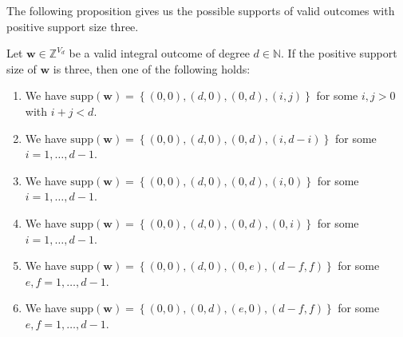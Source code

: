 The following proposition gives us the possible supports of valid outcomes with positive support size three.

\begin{proposition}\label{lemma:wmrkwjnr3w}
    Let \( \mathbf{w} \in \mathbb{Z}^{V_d} \) be a valid integral outcome of degree \( d \in \mathbb{N} \). If the positive support size of \( \mathbf{w} \) is three, then one of the following holds:
    \begin{enumerate}
        \item We have \( \mathrm{supp}(\mathbf{w}) = \left\{ (0,0), (d,0), (0,d), (i,j) \right\} \) for some \( i,j > 0 \) with \( i+j < d \).
        \item We have \( \mathrm{supp}(\mathbf{w}) = \left\{ (0,0), (d,0), (0,d), (i,d-i) \right\} \) for some \( i = 1, \dots, d-1 \).
        \item We have \( \mathrm{supp}(\mathbf{w}) = \left\{ (0,0), (d,0), (0,d), (i,0) \right\} \) for some \( i = 1, \dots, d-1 \).
        \item We have \( \mathrm{supp}(\mathbf{w}) = \left\{ (0,0), (d,0), (0,d), (0,i) \right\} \) for some \( i = 1, \dots, d-1 \).
        \item We have \( \mathrm{supp}(\mathbf{w}) = \left\{ (0,0), (d,0), (0,e), (d-f,f) \right\} \) for some \( e,f = 1 , \dots, d-1 \).
        \item We have \( \mathrm{supp}(\mathbf{w}) = \left\{ (0,0), (0,d), (e,0), (d-f,f) \right\} \) for some \( e,f = 1 , \dots, d-1 \).
    \end{enumerate}
\end{proposition}

